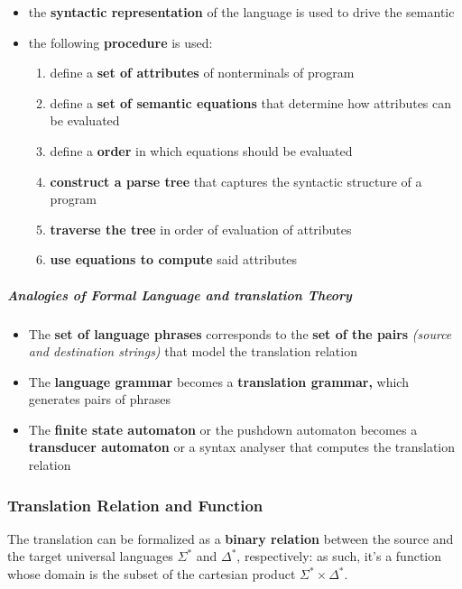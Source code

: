 \documentclass[english]{article}
\begin{document}
\begin{itemize}
  \item the \textbf{syntactic representation} of the language is used to drive the semantic
  \item the following \textbf{procedure} is used:
        \begin{enumerate}
          \item define a \textbf{set of attributes} of nonterminals of program
          \item define a \textbf{set of semantic equations} that determine how attributes can be evaluated
          \item define a \textbf{order} in which equations should be evaluated
          \item \textbf{construct a parse tree} that captures the syntactic structure of a program
          \item \textbf{traverse the tree }in order of evaluation of attributes
          \item \textbf{use equations to compute} said attributes
        \end{enumerate}
\end{itemize}

\subparagraph*{Analogies of Formal Language and translation Theory}

\begin{itemize}
  \item The \textbf{set of language phrases} corresponds to the \textbf{set of the pairs} \textit{(source and destination strings)} that model the translation relation
  \item The \textbf{language grammar} becomes a \textbf{translation grammar,} which generates pairs of phrases
  \item The \textbf{finite state automaton} or the pushdown automaton becomes a \textbf{transducer automaton} or a syntax analyser that computes the translation relation
\end{itemize}

\subsubsection{Translation Relation and Function}

The translation can be formalized as a \textbf{binary relation} between the source and the target universal languages \(\Sigma^\ast\) and \(\Delta^\ast\), respectively:
as such, it's a function whose domain is the subset of the cartesian product \(\Sigma^\ast \times \Delta^\ast\).
\end{document}
